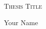 \begin{titlepage}


\centering
    \renewcommand{\baselinestretch}{1.7}\normalsize
    
    {\fontsize{1cm}{1.2em}\selectfont \scshape Thesis Title}
    
\vspace{18cm}
{\fontsize{20}{32}\selectfont Your Name}\\
\end{titlepage}
